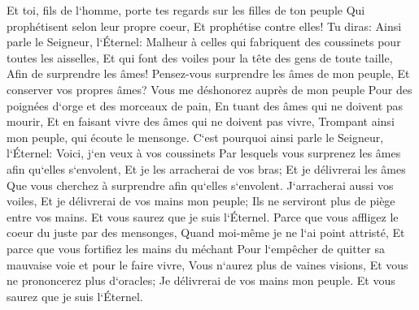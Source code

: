 \verse Et toi, fils de l`homme, porte tes regards sur les filles de ton peuple Qui prophétisent selon leur propre coeur, Et prophétise contre elles! 
\verse Tu diras: Ainsi parle le Seigneur, l`Éternel: Malheur à celles qui fabriquent des coussinets pour toutes les aisselles, Et qui font des voiles pour la tête des gens de toute taille, Afin de surprendre les âmes! Pensez-vous surprendre les âmes de mon peuple, Et conserver vos propres âmes? 
\verse Vous me déshonorez auprès de mon peuple Pour des poignées d`orge et des morceaux de pain, En tuant des âmes qui ne doivent pas mourir, Et en faisant vivre des âmes qui ne doivent pas vivre, Trompant ainsi mon peuple, qui écoute le mensonge. 
\verse C`est pourquoi ainsi parle le Seigneur, l`Éternel: Voici, j`en veux à vos coussinets Par lesquels vous surprenez les âmes afin qu`elles s`envolent, Et je les arracherai de vos bras; Et je délivrerai les âmes Que vous cherchez à surprendre afin qu`elles s`envolent. 
\verse J`arracherai aussi vos voiles, Et je délivrerai de vos mains mon peuple; Ils ne serviront plus de piège entre vos mains. Et vous saurez que je suis l`Éternel. 
\verse Parce que vous affligez le coeur du juste par des mensonges, Quand moi-même je ne l`ai point attristé, Et parce que vous fortifiez les mains du méchant Pour l`empêcher de quitter sa mauvaise voie et pour le faire vivre, 
\verse Vous n`aurez plus de vaines visions, Et vous ne prononcerez plus d`oracles; Je délivrerai de vos mains mon peuple. Et vous saurez que je suis l`Éternel. 

\chapter{}

